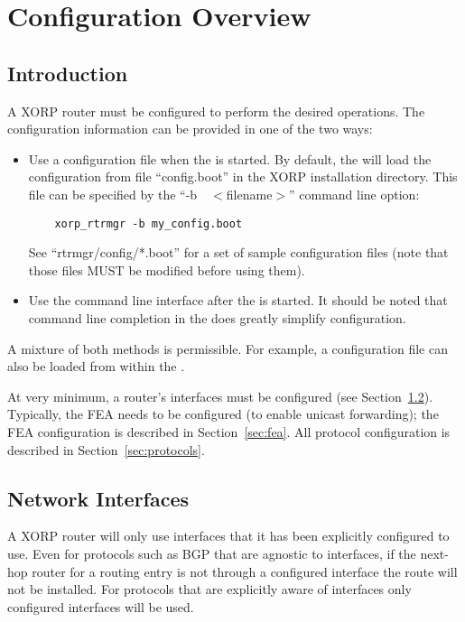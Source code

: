 %
%

\chapter{Configuration Overview}
\section{Introduction}

A XORP router must be configured to perform the desired operations.
The configuration information can be provided in one of the two ways:

\begin{itemize}
\item
  Use a configuration file when the \rtrmgr is started.
  By default, the \rtrmgr will load the configuration from file
  ``config.boot'' in the XORP installation directory.
  This file can be specified by the ``-b~~$<$filename$>$'' command line
  option:
\begin{verbatim}
    xorp_rtrmgr -b my_config.boot
\end{verbatim}

    See ``rtrmgr/config/*.boot'' for a set of sample
    configuration files (note that those files MUST be modified
    before using them).

\item
  Use the \xorpsh command line interface after the \rtrmgr is started.
  It should be noted that command line completion in the \xorpsh
  does greatly simplify configuration.
\end{itemize}

\noindent
A mixture of both methods is permissible. For example,
a configuration file can also be loaded from within the \xorpsh.

At very minimum, a router's interfaces must be configured (see
Section~\ref{sec:network_interfaces}). Typically, the FEA needs to be
configured (\eg to enable unicast forwarding); the FEA configuration is
described in Section~\ref{sec:fea}. All protocol configuration is
described in Section~\ref{sec:protocols}.

\section{Network Interfaces}
\label{sec:network_interfaces}

A XORP router will only use interfaces that it has been explicitly
configured to use. Even for protocols such as BGP that are agnostic to
interfaces, if the next-hop router for a routing entry is not through
a configured interface the route will not be installed. For protocols
that are explicitly aware of interfaces only configured interfaces
will be used.

